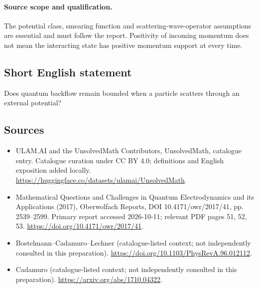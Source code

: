 \documentclass[11pt]{article}
\begin{document}
\paragraph{Source scope and qualification.}
The potential class, smearing function and scattering-wave-operator assumptions are essential and must follow the report. Positivity of incoming momentum does not mean the interacting state has positive momentum support at every time.
\subsection{Short English statement}
Does quantum backflow remain bounded when a particle scatters through an external potential?
\subsection{Sources}
\begin{itemize}
\item[\hypertarget{source:statement:1}{S1}] ULAM.AI and the UnsolvedMath Contributors, UnsolvedMath, catalogue entry. Catalogue curation under CC BY 4.0; definitions and English exposition added locally.
\url{https://huggingface.co/datasets/ulamai/UnsolvedMath}.
\item[\hypertarget{source:statement:2}{S2}] Mathematical Questions and Challenges in Quantum Electrodynamics and its Applications (2017), Oberwolfach Reports, DOI 10.4171/owr/2017/41, pp. 2539--2599. Primary report accessed 2026-10-11; relevant PDF pages 51, 52, 53.
\url{https://doi.org/10.4171/owr/2017/41}.
\item[\hypertarget{source:statement:3}{S3}] Bostelmann--Cadamuro--Lechner (catalogue-listed context; not independently consulted in this preparation).
\url{https://doi.org/10.1103/PhysRevA.96.012112}.
\item[\hypertarget{source:statement:4}{S4}] Cadamuro (catalogue-listed context; not independently consulted in this preparation).
\url{https://arxiv.org/abs/1710.04322}.
\end{itemize}
\label{end:statement}
\end{document}
